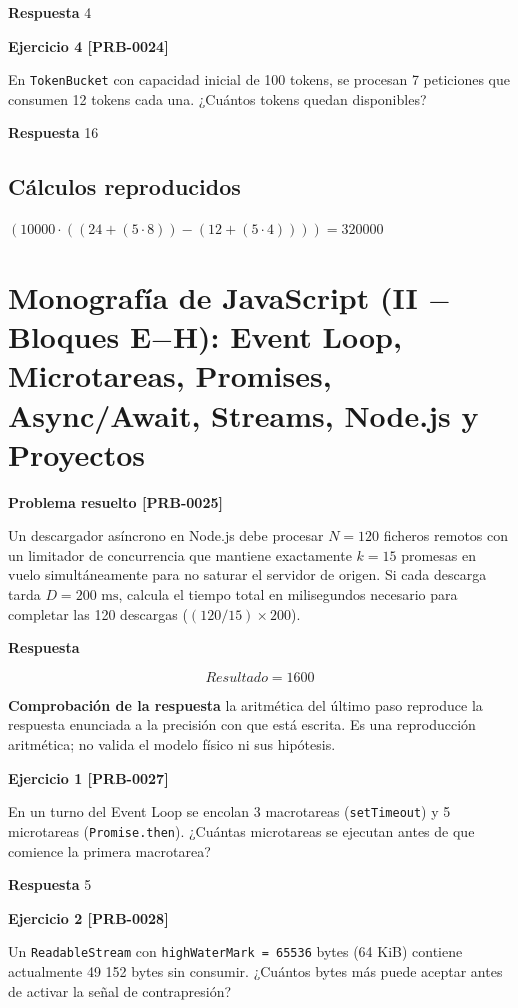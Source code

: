 \documentclass{book}
\begin{document}
\noindent\textbf{Respuesta} 4

\noindent\textbf{Ejercicio 4 [PRB-0024]}

En \texttt{TokenBucket} con capacidad inicial de 100 tokens, se procesan 7 peticiones que consumen 12 tokens cada una. ¿Cuántos tokens quedan disponibles?

\noindent\textbf{Respuesta} 16

\subsection*{Cálculos reproducidos}

\(\left(10000\cdot \left(\left(24+\left(5\cdot 8\right)\right)-\left(12+\left(5\cdot 4\right)\right)\right)\right) = 320000\)

\section{Monografía de JavaScript (II \(-\) Bloques E\(-\)H): Event Loop, Microtareas, Promises, Async/Await, Streams, Node.js y Proyectos}

\noindent\textbf{Problema resuelto [PRB-0025]}

Un descargador asíncrono en Node.js debe procesar \(N = 120\) ficheros remotos con un limitador de concurrencia que mantiene exactamente \(k = 15\) promesas en vuelo simultáneamente para no saturar el servidor de origen. Si cada descarga tarda \(D = 200\text{ ms}\), calcula el tiempo total en milisegundos necesario para completar las 120 descargas (\((120 / 15) \times 200\)).

\noindent\textbf{Respuesta}

\[
Resultado = 1600
\]

\noindent\textbf{Comprobación de la respuesta} la aritmética del último paso reproduce la respuesta enunciada a la precisión con que está escrita. Es una reproducción aritmética; no valida el modelo físico ni sus hipótesis.

\noindent\textbf{Ejercicio 1 [PRB-0027]}

En un turno del Event Loop se encolan 3 macrotareas (\texttt{setTimeout}) y 5 microtareas (\texttt{Promise.then}). ¿Cuántas microtareas se ejecutan antes de que comience la primera macrotarea?

\noindent\textbf{Respuesta} 5

\noindent\textbf{Ejercicio 2 [PRB-0028]}

Un \texttt{ReadableStream} con \texttt{highWaterMark = 65536} bytes (64 KiB) contiene actualmente 49 152 bytes sin consumir. ¿Cuántos bytes más puede aceptar antes de activar la señal de contrapresión?
\end{document}
